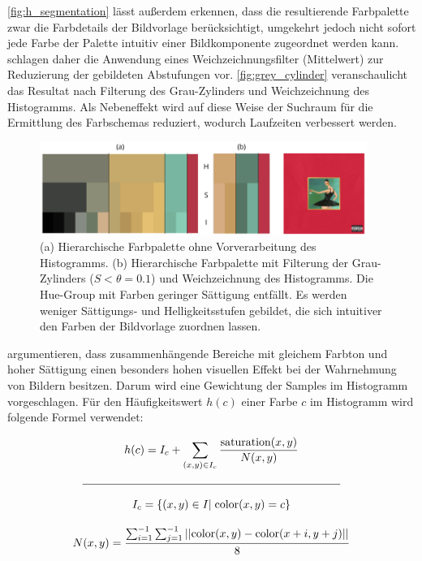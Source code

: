 \autoref{fig:h_segmentation} lässt außerdem erkennen, dass die resultierende Farbpalette zwar die Farbdetails der Bildvorlage berücksichtigt, umgekehrt jedoch nicht sofort jede Farbe der Palette intuitiv einer Bildkomponente zugeordnet werden kann. \citet{image-based-schemes} schlagen daher die Anwendung eines Weichzeichnungsfilter (Mittelwert) zur Reduzierung der gebildeten Abstufungen vor. \autoref{fig:grey_cylinder} veranschaulicht das Resultat nach Filterung des Grau-Zylinders und Weichzeichnung des Histogramms. Als Nebeneffekt wird auf diese Weise der Suchraum für die Ermittlung des Farbschemas reduziert, wodurch Laufzeiten verbessert werden.

\begin{figure}[]
\centering
\includegraphics[width=0.95\textwidth]{img/grey_cylinder.png}
\caption{(a) Hierarchische Farbpalette ohne Vorverarbeitung des Histogramms. (b) Hierarchische Farbpalette mit Filterung der Grau-Zylinders ($S < \theta = 0.1$) und Weichzeichnung des Histogramms. Die Hue-Group mit Farben geringer Sättigung entfällt. Es werden weniger Sättigungs- und Helligkeitsstufen gebildet, die sich intuitiver den Farben der Bildvorlage zuordnen lassen.}
\label{fig:grey_cylinder}
\end{figure}

\citet{image-based-schemes} argumentieren, dass zusammenhängende Bereiche mit gleichem Farbton und hoher Sättigung einen besonders hohen visuellen Effekt bei der Wahrnehmung von Bildern besitzen. Darum wird eine Gewichtung der Samples im Histogramm vorgeschlagen. Für den Häufigkeitswert $h(c)$ einer Farbe $c$ im Histogramm wird folgende Formel verwendet:

\begin{equation}
\label{eq:weight}
\begin{gathered}
	h(c) = I_c + \sum_{(x, y) \in I_c} \frac{ \text{saturation}(x, y) }{ N(x, y) }\\
  \mathclap{\rule{8cm}{0.4pt}}\\[2mm] 
  I_c = \{ (x, y) \in I |\; \text{color}(x, y) = c\} \\[3mm] 
  N(x, y) = \frac{ \sum_{i=1}^{-1} \sum_{j=1}^{-1} ||\text{color}(x, y) - \text{color}(x+i, y+j)||}{8}
\end{gathered}
\end{equation}


